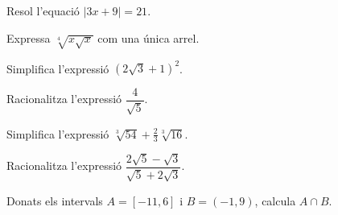 \begin{autoaval}{21}

\begin{mylist}
	
	\exer[2] Resol l'equació $|3x+9|=21$.

			
	\exer[2] Expressa $\sqrt[4]{x\sqrt{x}}$ com una única arrel.

	\exer[2] Simplifica l'expressió $(2\sqrt{3}+1)^2$.

	


	\exer[2] Racionalitza l'expressió $\dfrac{4}{\sqrt{5}}$.

	\exer[2] Simplifica l'expressió $\sqrt[3]{54} + \frac{2}{3}\sqrt[3]{16}$.

	\exer[2] Racionalitza l'expressió $\dfrac{2\sqrt{5}-\sqrt{3}}{\sqrt{5}+2\sqrt{3}}$.
 

	\exer[2] Donats els intervals $A=[-11,6]$ i $B=(-1,9)$, calcula $A\cap B$.

\answers{$(-1,\,6]$}
 
\end{mylist}

\vspace{1cm}

\end{autoaval}
 
